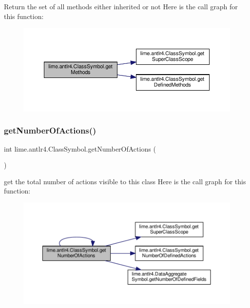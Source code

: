 Return the set of all methods either inherited or not Here is the call graph for this function\+:
\nopagebreak
\begin{figure}[H]
\begin{center}
\leavevmode
\includegraphics[width=350pt]{classlime_1_1antlr4_1_1ClassSymbol_a0bb56898dfcbdc91a1f81151524b54f5_cgraph}
\end{center}
\end{figure}
\mbox{\label{classlime_1_1antlr4_1_1ClassSymbol_a2d505f3b8d3fe0727ff72b55195a3b6e}} 
\subsubsection{\texorpdfstring{get\+Number\+Of\+Actions()}{getNumberOfActions()}}
{\footnotesize\ttfamily int lime.\+antlr4.\+Class\+Symbol.\+get\+Number\+Of\+Actions (\begin{DoxyParamCaption}{ }\end{DoxyParamCaption})}

get the total number of actions visible to this class Here is the call graph for this function\+:
\nopagebreak
\begin{figure}[H]
\begin{center}
\leavevmode
\includegraphics[width=350pt]{classlime_1_1antlr4_1_1ClassSymbol_a2d505f3b8d3fe0727ff72b55195a3b6e_cgraph}
\end{center}
\end{figure}
\mbox{\label{classlime_1_1antlr4_1_1ClassSymbol_a2cbf5115ef39f615447ea46a777cbb9f}} 
